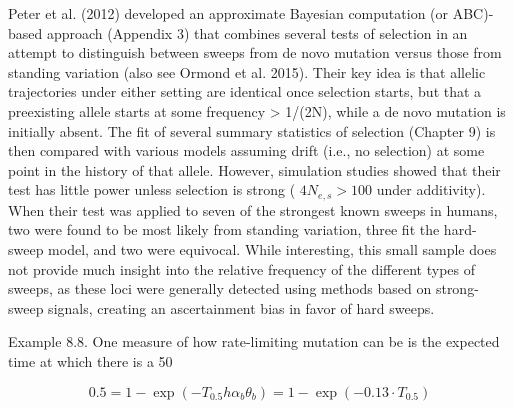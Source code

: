 \documentclass{article}
\begin{document}
Peter et al. (2012) developed an approximate Bayesian computation (or ABC)-based approach (Appendix 3) that combines several tests of selection in an attempt to distinguish between sweeps from de novo mutation versus those from standing variation (also see Ormond et al. 2015). Their key idea is that allelic trajectories under either setting are identical once selection starts, but that a preexisting allele starts at some frequency > 1/(2N), while a de novo mutation is initially absent. The fit of several summary statistics of selection (Chapter 9) is then compared with various models assuming drift (i.e., no selection) at some point in the history of that allele. However, simulation studies showed that their test has little power unless selection is strong ( $ 4N_{e,s} > 100 $ under additivity). When their test was applied to seven of the strongest known sweeps in humans, two were found to be most likely from standing variation, three fit the hard-sweep model, and two were equivocal. While interesting, this small sample does not provide much insight into the relative frequency of the different types of sweeps, as these loci were generally detected using methods based on strong-sweep signals, creating an ascertainment bias in favor of hard sweeps.

Example 8.8. One measure of how rate-limiting mutation can be is the expected time at which there is a 50%

\begin{equation}
0.5=1-\exp(-T_{0.5}h\alpha_{b}\theta_{b})=1-\exp(-0.13\cdot T_{0.5})
\end{equation}
\end{document}
